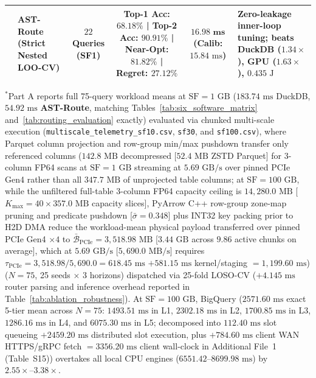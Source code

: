 \documentclass[10pt,a4paper]{article}
\newenvironment{fitasttable}{%
  \begin{lrbox}{\asttblbox}%
}{%
  \end{lrbox}%
  \sbox{\asttblboxB}{%
    \ifdim\wd\asttblbox>0.96\textwidth
      \resizebox{0.96\textwidth}{!}{\usebox{\asttblbox}}%
    \else
      \usebox{\asttblbox}%
    \fi
  }%
  \ifdim\ht\asttblboxB>0.72\textheight
    \resizebox{!}{0.72\textheight}{\usebox{\asttblboxB}}%
  \else
    \usebox{\asttblboxB}%
  \fi
}
\begin{document}
\begin{table}[!htbp]
\begin{fitasttable}
{\begin{tabular}{@{}llcccccccl@{}}
 & \textbf{AST-Route (Strict Nested LOO-CV)} & $22$ Queries (SF1) & \multicolumn{5}{c}{Top-1 Acc: $\mathbf{68.18\%}$ | Top-2 Acc: $\mathbf{90.91\%}$ | Near-Opt: $\mathbf{81.82\%}$ | Regret: $\mathbf{27.12\%}$} & $\mathbf{16.98\text{ ms}}$ (Calib: $15.84\text{ ms}$) & Zero-leakage inner-loop tuning; beats DuckDB ($1.34\times$), GPU ($1.63\times$), $0.435\text{ J}$ \\
\bottomrule
\end{tabular}
}
\end{fitasttable}%
\vspace{2pt}
\parbox{0.96\textwidth}{\scriptsize $^{*}$Part A reports full 75-query workload means at $\text{SF}=1\text{ GB}$ ($183.74\text{ ms}$ DuckDB, $54.92\text{ ms}$ \textbf{AST-Route}, matching Tables~\ref{tab:six_software_matrix} and~\ref{tab:routing_evaluation} exactly) evaluated via chunked multi-scale execution (\texttt{multiscale\_\allowbreak{}telemetry\_\allowbreak{}sf10.csv}, \texttt{sf30}, and \texttt{sf100.csv}), where Parquet column projection and row-group min/max pushdown transfer only referenced columns ($142.8\text{ MB}$ decompressed [$52.4\text{ MB}$ ZSTD Parquet] for 3-column FP64 scans at $\text{SF}=1\text{ GB}$ streaming at $5.69\text{ GB/s}$ over pinned PCIe Gen4 rather than all $347.7\text{ MB}$ of unprojected table columns; at $\text{SF}=100\text{ GB}$, while the unfiltered full-table 3-column FP64 capacity ceiling is $14{,}280.0\text{ MB}$ [$K_{\max}=40 \times 357.0\text{ MB}$ capacity slices], PyArrow C++ row-group zone-map pruning and predicate pushdown [$\bar{\sigma}=0.348$] plus INT32 key packing prior to H2D DMA reduce the workload-mean physical payload transferred over pinned PCIe Gen4 $\times 4$ to $\bar{\mathcal{B}}_{\text{PCIe}}=3{,}518.98\text{ MB}$ [$3.44\text{ GB}$ across $9.86$ active chunks on average], which at $5.69\text{ GB/s}$ [$5{,}690.0\text{ MB/s}$] requires $\tau_{\text{PCIe}} = 3{,}518.98 / 5{,}690.0 = 618.45\text{ ms}$ $+ 581.15\text{ ms}$ kernel/staging $= 1{,}199.60\text{ ms}$) ($N=75$, 25 seeds $\times$ 3 horizons) dispatched via 25-fold LOSO-CV ($+4.145\text{ ms}$ router parsing and inference overhead reported in Table~\ref{tab:ablation_robustness}). At $\text{SF}=100\text{ GB}$, BigQuery ($2571.60\text{ ms}$ exact 5-tier mean across $N=75$: $1493.51\text{ ms}$ in L1, $2302.18\text{ ms}$ in L2, $1700.85\text{ ms}$ in L3, $1286.16\text{ ms}$ in L4, and $6075.30\text{ ms}$ in L5; decomposed into $112.40\text{ ms}$ slot queueing $+ 2459.20\text{ ms}$ distributed slot execution, plus $+784.60\text{ ms}$ client WAN HTTPS/gRPC fetch $= 3356.20\text{ ms}$ client wall-clock in Additional File~1 (Table~S15)) overtakes all local CPU engines ($6551.42\text{--}8699.98\text{ ms}$) by $\mathbf{2.55\times\text{--}3.38\times}$.}
\end{table}
\end{document}
